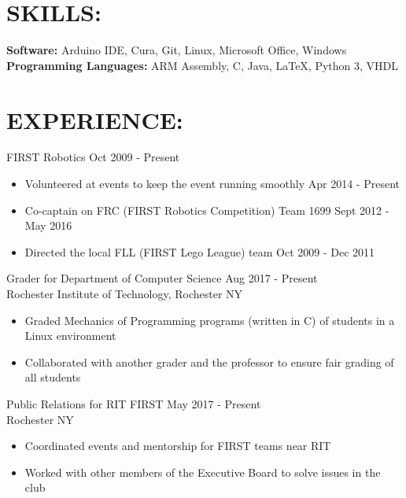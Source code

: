 \documentclass[line,margin]{res}
\begin{document}
\begin{resume}
\section{SKILLS:}

	\textbf{Software:} Arduino IDE, Cura, Git, Linux, Microsoft Office, Windows \\
	\textbf{Programming Languages:} ARM Assembly, C, Java, \LaTeX, Python 3, VHDL 

\section{EXPERIENCE:}

	FIRST Robotics \hfill Oct 2009 - Present
	\begin{itemize}
		\item Volunteered at events to keep the event running smoothly \hfill Apr 2014 - Present
		\item Co-captain on FRC (FIRST Robotics Competition) Team 1699 \hfill Sept 2012 - May 2016
		\item Directed the local FLL (FIRST Lego League) team \hfill Oct 2009 - Dec 2011
	\end{itemize}
	\vspace{-8pt}

	Grader for Department of Computer Science \hfill Aug 2017 - Present\\
	Rochester Institute of Technology, Rochester NY
	\begin{itemize}
		\item Graded Mechanics of Programming programs (written in C) of students in a Linux environment
		\item Collaborated with another grader and the professor to ensure fair grading of all students
	\end{itemize}
	\vspace{-8pt}	

	Public Relations for RIT FIRST \hfill May 2017 - Present\\
	Rochester NY
	\begin{itemize}
		\item Coordinated events and mentorship for FIRST teams near RIT
		\item Worked with other members of the Executive Board to solve issues in the club
	\end{itemize}


\end{resume}
\end{document}
